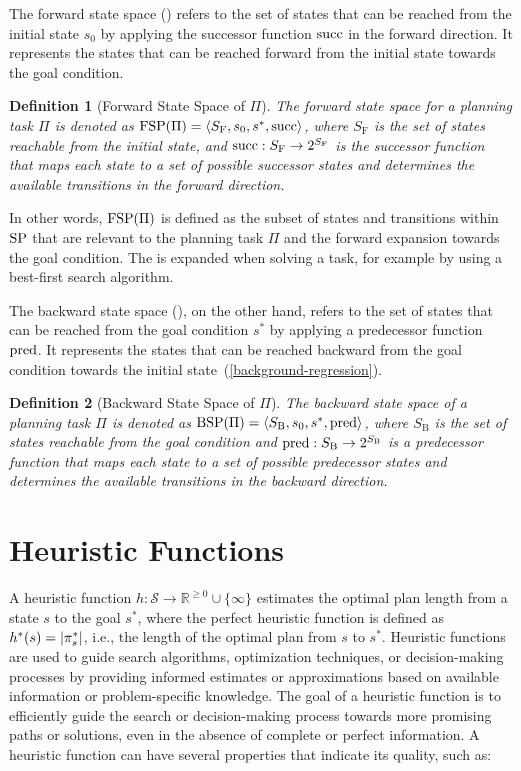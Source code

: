 \documentclass[ppgc,diss,english]{iiufrgs}
\newtheorem{definition}{Definition}
\begin{document}
The forward state space (\fsp) refers to the set of states that can be reached from the initial state $s_0$ by applying the successor function $\operatorname{succ}$ in the forward direction. It represents the states that can be reached forward from the initial state towards the goal condition.

\begin{definition}[Forward State Space of $\Pi$]
The forward state space for a planning task $\Pi$ is denoted as ${\text{FSP}}(\Pi) = \langle S_{\text{F}}, s_0, s^{*}, \operatorname{succ} \rangle$, where $S_{\text{F}}$ is the set of states reachable from the initial state, and $\operatorname{succ} : S_{\text{F}} \to 2^{S_{\text{F}}}$ is the successor function that maps each state to a set of possible successor states and determines the available transitions in the forward direction.
\end{definition}

In other words, ${\text{FSP}}(\Pi)$ is defined as the subset of states and transitions within ${\text{SP}}$ that are relevant to the planning task $\Pi$ and the forward expansion towards the goal condition. The \fsp is expanded when solving a task, for example by using a best-first search algorithm.

The backward state space (\bsp), on the other hand, refers to the set of states that can be reached from the goal condition $s^{*}$ by applying a predecessor function $\operatorname{pred}$. It represents the states that can be reached backward from the goal condition towards the initial state~(\cref{background-regression}).

\begin{definition}[Backward State Space of $\Pi$]
The backward state space of a planning task $\Pi$ is denoted as ${\text{BSP}}(\Pi) = \langle S_{\text{B}}, s_{0}, s^{*}, \operatorname{pred} \rangle$, where $S_{\text{B}}$ is the set of states reachable from the goal condition and $\operatorname{pred} : S_{\text{B}} \to 2^{S_{\text{B}}}$ is a predecessor function that maps each state to a set of possible predecessor states and determines the available transitions in the backward direction.
\end{definition}


\section{Heuristic Functions}
\label{sec:background-heuristics}
A heuristic function $h:\mathcal{S}\rightarrow \mathbb{R}^{\geq 0}\cup\{\infty\}$ estimates the optimal plan length from a state $s$ to the goal $s^*$, where the perfect heuristic function is defined as $h^{*}(s) = |\pi_{s}^{*}|$, i.e., the length of the optimal plan from $s$ to $s^{*}$. Heuristic functions are used to guide search algorithms, optimization techniques, or decision-making processes by providing informed estimates or approximations based on available information or problem-specific knowledge. The goal of a heuristic function is to efficiently guide the search or decision-making process towards more promising paths or solutions, even in the absence of complete or perfect information. A heuristic function can have several properties that indicate its quality, such as:
\end{document}
